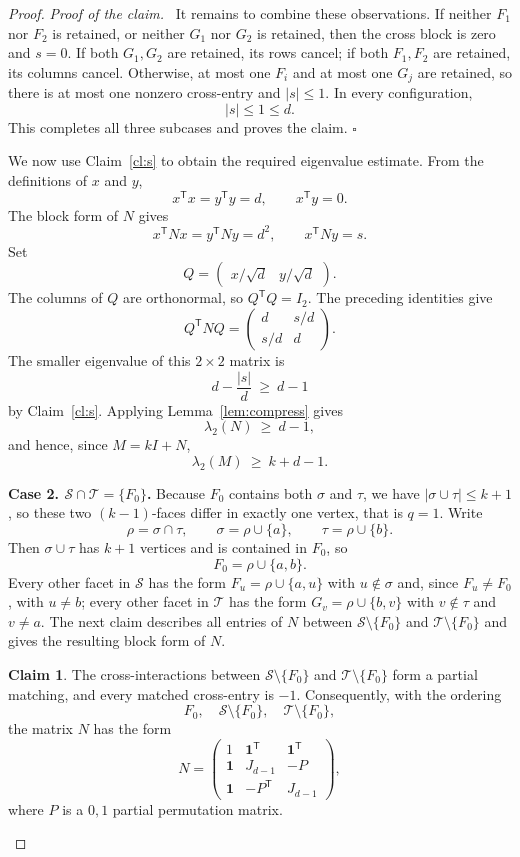 \documentclass[11pt,reqno]{amsart}
\numberwithin{equation}{section}
\theoremstyle{plain}
\theoremstyle{definition}
\newtheorem{innerclaim}{Claim}
\newenvironment{claim}{\begin{innerclaim}}{\end{innerclaim}}
\newenvironment{claimproof}
  {\par\smallskip\noindent\textit{Proof of the claim.}\ }
  {\hfill$\square$\par\smallskip}
\newcommand{\ones}{\mathbf{1}}
\newcommand{\T}{\mathsf{T}}
\newcommand{\Sset}{\mathcal S}
\newcommand{\Tset}{\mathcal T}
\begin{document}
\begin{proof}
\begin{claimproof}
It remains to combine these observations. If neither $F_1$ nor $F_2$ is retained, or neither
$G_1$ nor $G_2$ is retained, then the cross block is zero and $s=0$. If both $G_1,G_2$ are
retained, its rows cancel; if both $F_1,F_2$ are retained, its columns cancel. Otherwise, at
most one $F_i$ and at most one $G_j$ are retained, so there is at most one nonzero cross-entry
and $|s|\le1$. In every configuration,
\[
  |s|\le1\le d .
\]
This completes all three subcases and proves the claim.
\end{claimproof}

We now use Claim~\ref{cl:s} to obtain the required eigenvalue estimate. From the definitions
of $x$ and $y$,
\[
  x^{\T}x=y^{\T}y=d,\qquad x^{\T}y=0 .
\]
The block form of $N$ gives
\[
  x^{\T}Nx=y^{\T}Ny=d^2,
  \qquad
  x^{\T}Ny=s .
\]
Set
\[
  Q=\begin{pmatrix}x/\sqrt d & y/\sqrt d\end{pmatrix} .
\]
The columns of $Q$ are orthonormal, so $Q^{\T}Q=I_2$. The preceding identities give
\[
  Q^{\T}NQ
  =\begin{pmatrix}
      d & s/d\\[2pt]
      s/d & d
    \end{pmatrix} .
\]
The smaller eigenvalue of this $2\times2$ matrix is
\[
  d-\frac{|s|}{d}\ \ge\ d-1
\]
by Claim~\ref{cl:s}. Applying Lemma~\ref{lem:compress} gives
\[
  \lambda_2(N)\ \ge\ d-1 ,
\]
and hence, since $M=kI+N$,
\[
  \lambda_2(M)\ \ge\ k+d-1 .
\]

\medskip
\noindent\textbf{Case 2. $\Sset\cap\Tset=\{F_0\}$.}
Because $F_0$ contains both $\sigma$ and $\tau$, we have $|\sigma\cup\tau|\le k+1$, so these two
$(k-1)$-faces differ in exactly one vertex, that is $q=1$. Write
\[
  \rho=\sigma\cap\tau,\qquad \sigma=\rho\cup\{a\},\qquad \tau=\rho\cup\{b\} .
\]
Then $\sigma\cup\tau$ has $k+1$ vertices and is contained in $F_0$, so
\[
  F_0=\rho\cup\{a,b\} .
\]
Every other facet in $\Sset$ has the form $F_u=\rho\cup\{a,u\}$ with $u\notin\sigma$ and, since
$F_u\ne F_0$, with $u\ne b$; every other facet in $\Tset$ has the form $G_v=\rho\cup\{b,v\}$
with $v\notin\tau$ and $v\ne a$. The next claim describes all entries of $N$ between
$\Sset\setminus\{F_0\}$ and $\Tset\setminus\{F_0\}$ and gives the resulting block form of $N$.

\begin{claim}\label{cl:structure}
The cross-interactions between $\Sset\setminus\{F_0\}$ and $\Tset\setminus\{F_0\}$ form a
partial matching, and every matched cross-entry is $-1$. Consequently, with the ordering
\[
  F_0,\quad \Sset\setminus\{F_0\},\quad \Tset\setminus\{F_0\},
\]
the matrix $N$ has the form
\[
  N=\begin{pmatrix}
    1 & \ones^{\T} & \ones^{\T}\\
    \ones & J_{d-1} & -P\\
    \ones & -P^{\T} & J_{d-1}
  \end{pmatrix},
\]
where $P$ is a $0,1$ partial permutation matrix.
\end{claim}


\end{proof}
\end{document}

